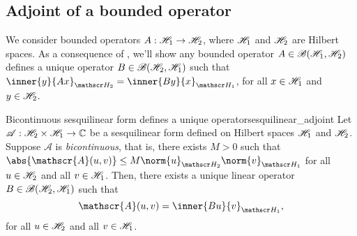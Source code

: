 \subsection{Adjoint of a bounded operator}
We consider bounded operators \(A : \mathscr{H}_1 \to \mathscr{H}_2\), where \(\mathscr{H}_1\) and \(\mathscr{H}_2\) are Hilbert spaces. As a consequence of , we'll show any bounded operator \(A \in \mathscr{B}(\mathscr{H}_1, \mathscr{H}_2)\) defines a unique operator \(B \in \mathscr{B}(\mathscr{H}_2, \mathscr{H}_1)\) such that \(\inner{y}{Ax}_{\hilbert_2} = \inner{By}{x}_{\hilbert_1}\), for all \(x \in \mathscr{H}_1\) and \(y \in \mathscr{H}_2\).
\begin{lemma}{Bicontinuous sesquilinear form defines a unique operator}{sesquilinear_adjoint}
    Let \(\mathscr{A} : \mathscr{H}_2 \times \mathscr{H}_1 \to \mathbb{C}\) be a sesquilinear form defined on Hilbert spaces \(\mathscr{H}_1\) and \(\mathscr{H}_2\). Suppose \(\mathscr{A}\) is \emph{bicontinuous}, that is, there exists \(M > 0\) such that \(\abs{\mathscr{A}(u,v)} \leq M\norm{u}_{\hilbert_2} \norm{v}_{\hilbert_1}\) for all \(u \in \mathscr{H}_2\) and all \(v \in \mathscr{H}_1\). Then, there exists a unique linear operator \(B \in \mathscr{B}(\mathscr{H}_2, \mathscr{H}_1)\) such that
    \begin{equation*}
        \mathscr{A}(u,v) = \inner{Bu}{v}_{\hilbert_1},
    \end{equation*}
    for all \(u \in \mathscr{H}_2\) and all \(v \in \mathscr{H}_1\).
\end{lemma}
